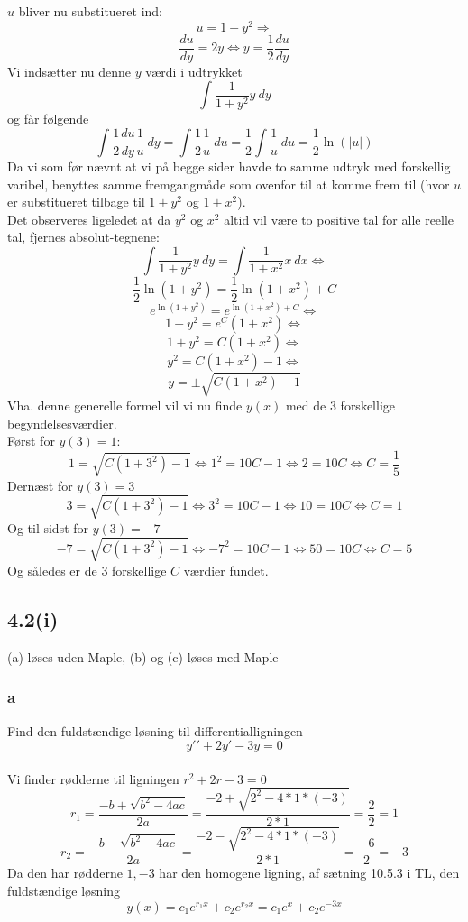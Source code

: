 \documentclass[12pt]{article}
\begin{document}
$u$ bliver nu substitueret ind:
$$u=1+y^2 \Rightarrow$$
$$\dfrac{du}{dy}=2y \Leftrightarrow y = \dfrac{1}{2} \dfrac{du}{dy}$$
Vi indsætter nu denne $y$ værdi i udtrykket
$$\int \dfrac{1}{1+y^2} y \: dy$$
og får følgende
$$\int \dfrac{1}{2} \dfrac{du}{dy} \dfrac{1}{u}\: dy = \int \dfrac{1}{2}\dfrac{1}{u}\: du = \dfrac{1}{2} \int \dfrac{1}{u} \: du = \dfrac{1}{2}\ln(|u|)$$
Da vi som før nævnt at vi på begge sider havde to samme udtryk med forskellig varibel, benyttes samme fremgangmåde som ovenfor til at komme frem til (hvor $u$ er substitueret tilbage til $1+y^2$ og $1+x^2$).\\ 
Det observeres ligeledet at da $y^2$ og $x^2$ altid vil være to positive tal for alle reelle tal, fjernes absolut-tegnene:
$$\int \dfrac{1}{1+y^2} y \: dy = \int \dfrac{1}{1+x^2}x\: dx \Leftrightarrow$$
$$\dfrac{1}{2}\ln(1+y^2) =\dfrac{1}{2}\ln(1+x^2) + C$$
$$e^{\ln(1+y^2)} = e^{\ln(1+x^2)+C} \Leftrightarrow$$
$$1+y^2=e^{C}(1+x^2) \Leftrightarrow$$
$$1+y^2=C(1+x^2)\Leftrightarrow$$
$$y^2=C(1+x^2)-1\Leftrightarrow$$
$$y=\pm \sqrt{C(1+x^2)-1}$$
Vha. denne generelle formel vil vi nu finde $y(x)$ med de $3$ forskellige begyndelsesværdier.\\
Først for $y(3)=1$:
$$1=\sqrt{C(1+3^2)-1} \Leftrightarrow 1^2 = 10C-1 \Leftrightarrow 2=10C \Leftrightarrow C = \dfrac{1}{5}$$
Dernæst for $y(3)=3$
$$3=\sqrt{C(1+3^2)-1}\Leftrightarrow 3^2 = 10C-1 \Leftrightarrow 10=10C \Leftrightarrow C= 1$$
Og til sidst for $y(3)=-7$
$$-7=\sqrt{C(1+3^2)-1}\Leftrightarrow -7^2 = 10C-1 \Leftrightarrow 50=10C \Leftrightarrow C= 5$$
Og således er de 3 forskellige $C$ værdier fundet.
\newpage
\subsection*{4.2(i)}
(a) løses uden Maple, (b) og (c) løses med Maple

\subsubsection*{a}
Find den fuldstændige løsning til differentialligningen
$$y\prime\prime+2y\prime-3y=0$$
\\
Vi finder rødderne til ligningen $r^2+2r-3=0$
$$r_1=\frac{-b+\sqrt{b^2-4ac}}{2a}=\frac{-2+\sqrt{2^2-4*1*(-3)}}{2*1}=\frac{2}{2}=1$$
$$r_2=\frac{-b-\sqrt{b^2-4ac}}{2a}=\frac{-2-\sqrt{2^2-4*1*(-3)}}{2*1}=\frac{-6}{2}=-3$$
Da den har rødderne $1,-3$ har den homogene ligning, af sætning 10.5.3 i TL, den fuldstændige løsning
$$y(x)=c_1e^{r_1x}+c_2e^{r_2x}=c_1e^{x}+c_2e^{-3x}$$
\end{document}

